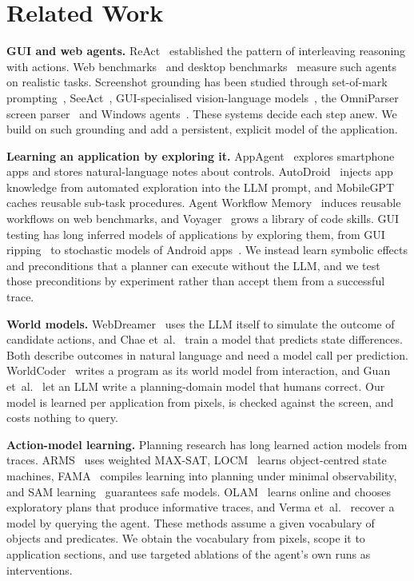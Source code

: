 \documentclass[conference]{IEEEtran}
\begin{document}
\section{Related Work}
\textbf{GUI and web agents.} ReAct~\cite{yao2023react} established the pattern of interleaving reasoning with actions. Web benchmarks~\cite{zhou2024webarena,koh2024visualwebarena,deng2023mind2web} and desktop benchmarks~\cite{xie2024osworld} measure such agents on realistic tasks. Screenshot grounding has been studied through set-of-mark prompting~\cite{yang2023som}, SeeAct~\cite{zheng2024seeact}, GUI-specialised vision-language models~\cite{hong2024cogagent,cheng2024seeclick}, the OmniParser screen parser~\cite{lu2024omniparser} and Windows agents~\cite{zhang2024ufo}. These systems decide each step anew. We build on such grounding and add a persistent, explicit model of the application.

\textbf{Learning an application by exploring it.} AppAgent~\cite{zhang2023appagent} explores smartphone apps and stores natural-language notes about controls. AutoDroid~\cite{wen2024autodroid} injects app knowledge from automated exploration into the LLM prompt, and MobileGPT~\cite{lee2023mobilegpt} caches reusable sub-task procedures. Agent Workflow Memory~\cite{wang2025awm} induces reusable workflows on web benchmarks, and Voyager~\cite{wang2024voyager} grows a library of code skills. GUI testing has long inferred models of applications by exploring them, from GUI ripping~\cite{memon2003ripping} to stochastic models of Android apps~\cite{su2017stoat}. We instead learn symbolic effects and preconditions that a planner can execute without the LLM, and we test those preconditions by experiment rather than accept them from a successful trace.

\textbf{World models.} WebDreamer~\cite{gu2025webdreamer} uses the LLM itself to simulate the outcome of candidate actions, and Chae et~al.~\cite{chae2025wma} train a model that predicts state differences. Both describe outcomes in natural language and need a model call per prediction. WorldCoder~\cite{tang2024worldcoder} writes a program as its world model from interaction, and Guan et~al.~\cite{guan2023llmpddl} let an LLM write a planning-domain model that humans correct. Our model is learned per application from pixels, is checked against the screen, and costs nothing to query.

\textbf{Action-model learning.} Planning research has long learned action models from traces. ARMS~\cite{yang2007arms} uses weighted MAX-SAT, LOCM~\cite{cresswell2013locm} learns object-centred state machines, FAMA~\cite{aineto2019fama} compiles learning into planning under minimal observability, and SAM learning~\cite{juba2021sam} guarantees safe models. OLAM~\cite{lamanna2021olam} learns online and chooses exploratory plans that produce informative traces, and Verma et~al.~\cite{verma2021asking} recover a model by querying the agent. These methods assume a given vocabulary of objects and predicates. We obtain the vocabulary from pixels, scope it to application sections, and use targeted ablations of the agent's own runs as interventions.
\end{document}
